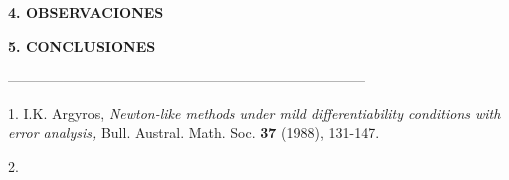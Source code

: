 \documentclass[twocolumn,twoside]{article}
\begin{document}
\begin{center}
{\large \bf 4. OBSERVACIONES}
\end{center}

\begin{center}
{\large \bf 5. CONCLUSIONES}
\end{center}




\begin{center}
 -----------------------------------------------------------------------------
\end{center}

\begin{list}{}{\setlength{\topsep}{0mm}\setlength{\itemsep}{0mm}%
\setlength{\parsep}{0mm}\setlength{\leftmargin}{4mm}}
%
\small
\item[1.] I.K. Argyros, \textit{Newton-like methods under mild \linebreak differentiability conditions with error analysis,} Bull. \linebreak Austral. Math. Soc. \textbf{37} (1988), 131-147.
\item[2.] 
%
\end{list}
\end{document}
